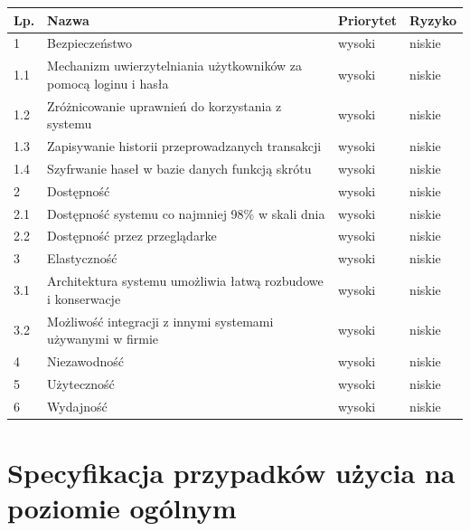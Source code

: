 \begin{table}[h]
	\begin{center}
		\begin{tabular}{| l | l | l | l |}
			\hline
			\textbf{Lp.} & \textbf{Nazwa} & \textbf{Priorytet} & \textbf{Ryzyko} \\
			\hline
			1 & Bezpieczeństwo & wysoki & niskie \\
			1.1 & Mechanizm uwierzytelniania użytkowników za pomocą loginu i hasła &
			wysoki & niskie \\
			1.2 & Zróżnicowanie uprawnień do korzystania z systemu & wysoki & niskie \\
			1.3 & Zapisywanie historii przeprowadzanych transakcji & wysoki & niskie \\
			1.4 & Szyfrwanie haseł w bazie danych funkcją skrótu & wysoki & niskie \\
			\hline
			2 & Dostępność & wysoki & niskie \\
			2.1 & Dostępność systemu co najmniej 98\% w skali dnia & wysoki & niskie \\ 
			2.2 & Dostępność przez przeglądarke & wysoki & niskie \\
			\hline
			3 & Elastyczność & wysoki & niskie \\
			3.1 & Architektura systemu umożliwia łatwą rozbudowe i konserwacje & wysoki &
			niskie \\
			3.2 & Możliwość integracji z innymi systemami używanymi w firmie & wysoki &
			niskie \\
			
			\hline
			4 & Niezawodność & wysoki & niskie \\
			\hline
			5 & Użyteczność & wysoki & niskie \\
			\hline
			6 & Wydajność & wysoki & niskie \\
			\hline
		\end{tabular}
	\end{center}
\end{table}
\FloatBarrier

\section{Specyfikacja przypadków użycia na poziomie ogólnym}

